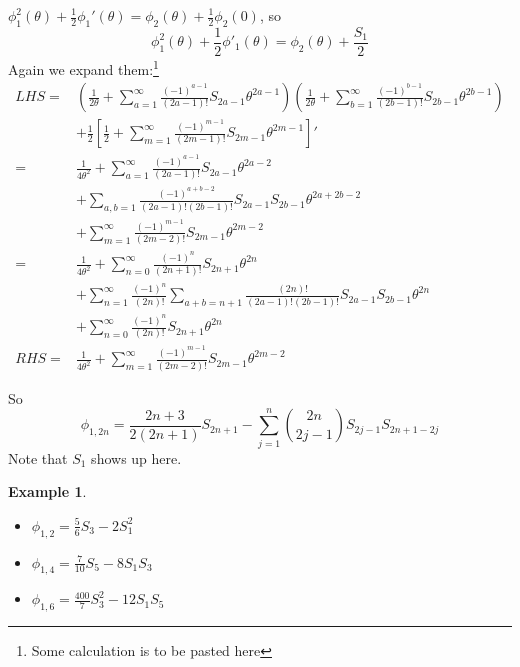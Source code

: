 \documentclass{article}
\newtheorem{Eg}{Example}[section]
\begin{document}
$\phi_1^2(\theta) + \frac{1}{2}\phi_1'(\theta) = \phi_2(\theta) + \frac{1}{2}\phi_2(0)$, so
\begin{equation}
\phi_1^2(\theta)+ \frac{1}{2}\phi'_1(\theta) = \phi_2(\theta) + \frac{S_1}{2}
\end{equation}
Again we expand them:\footnote{Some calculation is to be pasted here}
\begin{align*}
 LHS = &(\frac{1}{2\theta} + \sum\limits_{a=1}^{\infty} \frac{(-1)^{a-1}}{(2a-1)!}S_{2a-1}\theta^{2a-1})(\frac{1}{2\theta} + \sum\limits_{b=1}^{\infty} \frac{(-1)^{b-1}}{(2b-1)!} S_{2b-1}\theta^{2b-1})\\
       &+ \frac{1}{2} \left[ \frac{1}{2} + \sum\limits_{m=1}^{\infty} \frac{(-1)^{m-1}}{(2m-1)!}S_{2m-1}\theta^{2m-1} \right]'\\
     = & \frac{1}{4\theta^2} + \sum\limits_{a=1}^{\infty} \frac{(-1)^{a-1}}{(2a-1)!}S_{2a-1}\theta^{2a-2} \\
       &+ \sum\limits_{a,b=1}^{}\frac{(-1)^{a+b-2}}{(2a-1)!(2b-1)!}S_{2a-1}S_{2b-1}\theta^{2a+2b-2}\\
  & + \sum\limits_{m=1}^{\infty} \frac{(-1)^{m-1}}{(2m-2)!}S_{2m-1}\theta^{2m-2}\\
  = & \frac{1}{4\theta^2} + \sum\limits_{n=0}^{\infty} \frac{(-1)^n}{(2n+1)!}S_{2n+1}\theta^{2n}\\
       & + \sum\limits_{n=1}^{\infty} \frac{(-1)^n}{(2n)!} \sum\limits_{a+b=n+1}^{} \frac{(2n)!}{(2a-1)!(2b-1)!}S_{2a-1}S_{2b-1}\theta^{2n}\\
  & + \sum\limits_{n=0}^{\infty} \frac{(-1)^n}{(2n)!}S_{2n+1}\theta^{2n}\\
      RHS  =  & \frac{1}{4\theta^2} + \sum\limits_{m=1}^{\infty} \frac{(-1)^{m-1}}{(2m-2)!} S_{2m-1}\theta^{2m-2}
\end{align*}

So
\begin{equation}
\phi_{1,2n} = \frac{2n+3}{2(2n+1)} S_{2n+1} - \sum\limits_{j=1}^n \binom{2n}{2j-1}S_{2j-1}S_{2n+1-2j}
\end{equation}
Note that $S_1$ shows up here.
\begin{Eg}
  
\begin{itemize}
\item $\phi_{1,2} = \frac{5}{6}S_3 - 2S_1^2$
\item $\phi_{1,4} = \frac{7}{10}S_5 - 8 S_1S_3$
\item $\phi_{1,6} = \frac{400}{7}S_3^2 - 12 S_1S_5$
\end{itemize}
\end{Eg}
\end{document}
